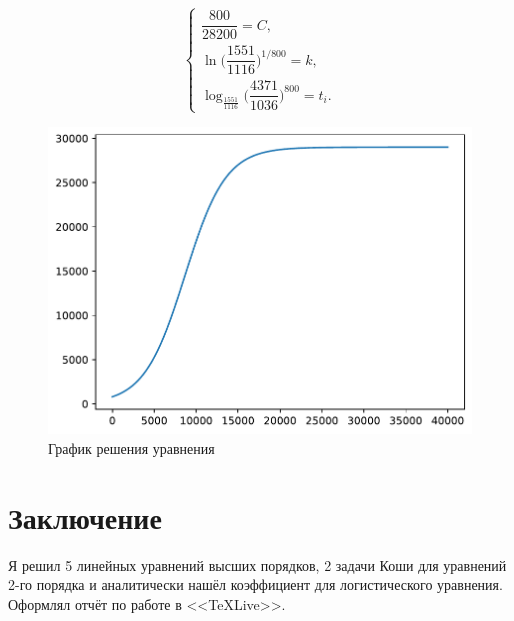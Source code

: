 \documentclass[a4paper, 14pt, fleqn]{extarticle}
\begin{document}
					\[\begin {cases}
						\dfrac{800}{28200} = C, \\[7pt]
						\ln{\bigg(\dfrac{1551}{1116}}\bigg)^{1/800} = k, \\[7pt]
						 \log_{\frac{1551}{1116}}\bigg({\dfrac{4371}{1036}}\bigg)^{800} = t_i.
					\end {cases}\]
			
					\begin{figure}[H]
					   	\centering
					    	\includegraphics[width = .75\linewidth]{3.pdf}
						\caption[.] {График решения уравнения}
  					\end{figure}		
					
	\section{Заключение}
		\noindent Я решил 5 линейных уравнений высших порядков, 2 задачи Коши для уравнений 2-го порядка и аналитически нашёл коэффициент для логистического уравнения. Оформлял отчёт по работе в <<\TeX \:Live>>.
\end{document}
